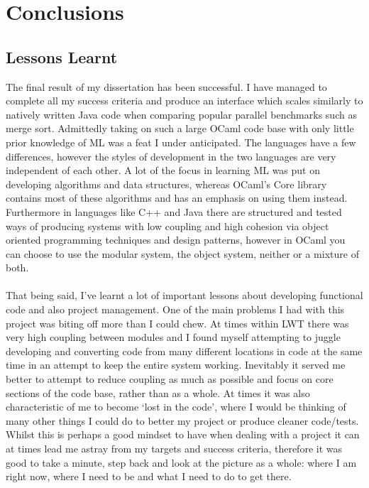 \documentclass[12pt,twoside,notitlepage]{report}
\begin{document}
\chapter{Conclusions}
\label{chap:conclusions}
%
%

%
%
\section{Lessons Learnt}
The final result of my dissertation has been successful. I have managed to complete all my success criteria and produce an interface which scales similarly to natively written Java code when comparing popular parallel benchmarks such as merge sort. Admittedly taking on such a
large OCaml code base with only little prior knowledge of ML was a feat I under anticipated. The languages have a few differences, however the styles of development in the two languages are very independent of each other. A lot of the
focus in learning ML was put on developing algorithms and data structures, whereas OCaml's Core library contains most of these algorithms and has an emphasis on using them instead. Furthermore in languages like C++ and Java there are
structured and tested ways of producing systems with low coupling and high cohesion via object oriented programming techniques and design patterns, however in OCaml you can choose to use the modular system, the object system, neither
or a mixture of both\cite{chailloux2000}. 
\hfill\\
\hfill\\
That being said, I've learnt a lot of important lessons about developing functional code and also project management. One of the main problems I had with this project was biting off more than I could chew. At times within LWT there
was very high coupling between modules and I found myself attempting to juggle developing and converting code from many different locations in code at the same time in an attempt to keep the entire system working. Inevitably it served
me better to attempt to reduce coupling as much as possible and focus on core sections of the code base, rather than as a whole. At times it was also characteristic of me to become `lost in the code', where I would be thinking of many
other things I could do to better my project or produce cleaner code/tests. Whilst this is perhaps a good mindset to have when dealing with a project it can at times lead me astray from my targets and success criteria, therefore it
was good to take a minute, step back and look at the picture as a whole: where I am right now, where I need to be and what I need to do to get there.
\end{document}
